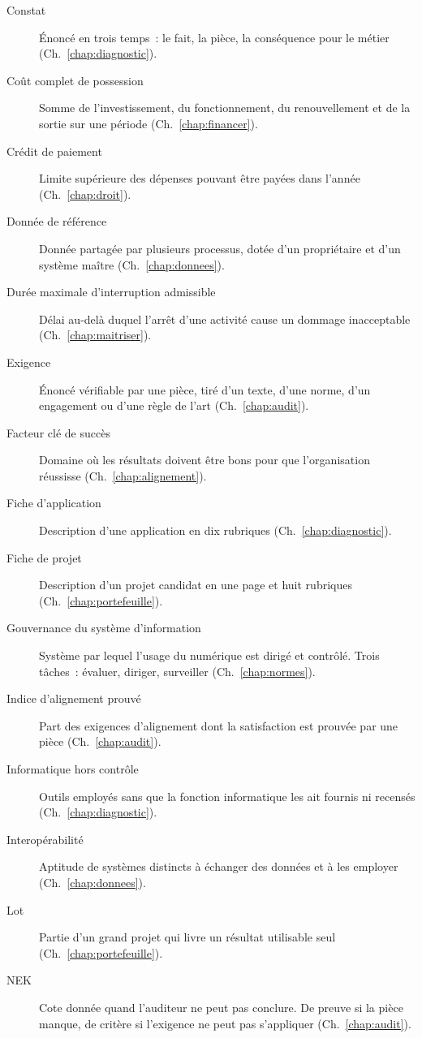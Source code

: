 \begin{description}
    \item[Constat] Énoncé en trois temps~: le fait, la pièce, la conséquence pour le métier (Ch.~\ref{chap:diagnostic}).
    \item[Coût complet de possession] Somme de l'investissement, du fonctionnement, du renouvellement et de la sortie sur une période (Ch.~\ref{chap:financer}).
    \item[Crédit de paiement] Limite supérieure des dépenses pouvant être payées dans l'année (Ch.~\ref{chap:droit}).
    \item[Donnée de référence] Donnée partagée par plusieurs processus, dotée d'un propriétaire et d'un système maître (Ch.~\ref{chap:donnees}).
    \item[Durée maximale d'interruption admissible] Délai au-delà duquel l'arrêt d'une activité cause un dommage inacceptable (Ch.~\ref{chap:maitriser}).
    \item[Exigence] Énoncé vérifiable par une pièce, tiré d'un texte, d'une norme, d'un engagement ou d'une règle de l'art (Ch.~\ref{chap:audit}).
    \item[Facteur clé de succès] Domaine où les résultats doivent être bons pour que l'organisation réussisse (Ch.~\ref{chap:alignement}).
    \item[Fiche d'application] Description d'une application en dix rubriques (Ch.~\ref{chap:diagnostic}).
    \item[Fiche de projet] Description d'un projet candidat en une page et huit rubriques (Ch.~\ref{chap:portefeuille}).
    \item[Gouvernance du système d'information] Système par lequel l'usage du numérique est dirigé et contrôlé. Trois tâches~: évaluer, diriger, surveiller (Ch.~\ref{chap:normes}).
    \item[Indice d'alignement prouvé] Part des exigences d'alignement dont la satisfaction est prouvée par une pièce (Ch.~\ref{chap:audit}).
    \item[Informatique hors contrôle] Outils employés sans que la fonction informatique les ait fournis ni recensés (Ch.~\ref{chap:diagnostic}).
    \item[Interopérabilité] Aptitude de systèmes distincts à échanger des données et à les employer (Ch.~\ref{chap:donnees}).
    \item[Lot] Partie d'un grand projet qui livre un résultat utilisable seul (Ch.~\ref{chap:portefeuille}).
    \item[NEK] Cote donnée quand l'auditeur ne peut pas conclure. De preuve si la pièce manque, de critère si l'exigence ne peut pas s'appliquer (Ch.~\ref{chap:audit}).

\end{description}

